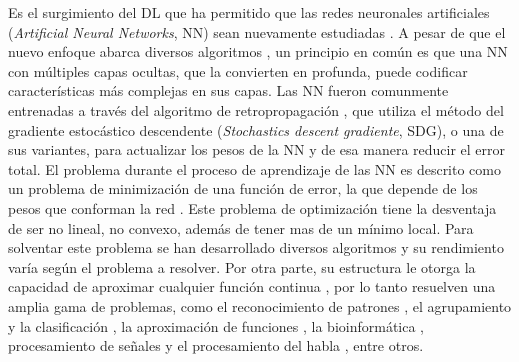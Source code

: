 

Es el surgimiento del DL que ha permitido que las redes neuronales artificiales ({\em Artificial Neural Networks}, NN) sean nuevamente estudiadas \cite{Bengio2006, Hinton2006, Le2012, Ranzato2007}. A pesar de que el nuevo enfoque abarca diversos algoritmos \cite{Bengio2007, Hinton2006}, un principio en común es que una NN con múltiples capas ocultas, que la convierten en profunda, puede codificar características más complejas en sus capas. Las NN fueron comunmente entrenadas a través del algoritmo de retropropagación \cite{Rumelhart1986b}, que utiliza el método del gradiente estocástico descendente ({\em Stochastics descent gradiente}, SDG), o una de sus variantes, para actualizar los pesos de la NN y de esa manera reducir el error total. El problema durante el proceso de aprendizaje de las NN es descrito como un problema de minimización de una función de error, la que depende de los pesos que conforman la red \cite{Rumelhart1986}. Este problema de optimización tiene la desventaja de ser no lineal, no convexo, además de tener mas de un mínimo local. Para solventar este problema se han desarrollado diversos algoritmos \cite{Grippo1994, Jacobs1988, Plagianakos2002, Rumelhart1986b, Plagianakos1998}  y su rendimiento varía según el problema a resolver. Por otra parte,  su estructura  le otorga la capacidad de aproximar cualquier función continua \cite{Hornik1991}, por lo tanto resuelven una amplia gama de problemas, como el reconocimiento de patrones \cite{Jain2000}, el agrupamiento y la clasificación \cite{Zhang2000}, la aproximación de funciones \cite{Selmic2002}, la bioinformática \cite{Mitra2006}, procesamiento de señales \cite{Hwang1997} y el procesamiento del habla \cite{Gorin1994}, entre otros.


